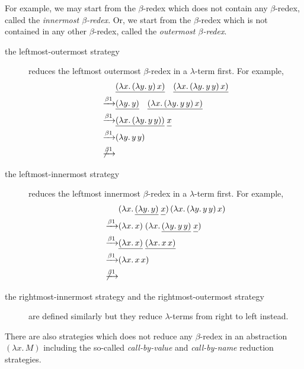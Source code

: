 For example, we may start from the $\beta$-redex which does not contain
any $\beta$-redex, called the \emph{innermost $\beta$-redex}. Or, we start from
the $\beta$-redex which is not contained in any other $\beta$-redex, called the
\emph{outermost $\beta$-redex}. 
\begin{description}
  \item[the leftmost-outermost strategy] reduces the leftmost outermost
    $\beta$-redex in a $\lambda$-term first. For example, 
    \begin{align*}
      & 
      \underline{(\lambda x.\, (\lambda y.\, y)\,x)}\quad
      \underline{(\lambda x.\, (\lambda y.\, y\,y)\,x)}
      \\
      \xrightarrow{\beta1} &
      \underline{(\lambda y.\, y)}\quad
      \underline{(\lambda x.\, (\lambda y.\, y\,y)\, x)} \\
      \xrightarrow{\beta1} &
      \underline{(\lambda x.\, (\lambda y.\, y\,y))}\;
      \underline{\vphantom{(\lambda}x} \\
      \xrightarrow{\beta1} & (\lambda y.\, y\,y) \\
      \not\xrightarrow{\beta1}
    \end{align*}
  \item[the leftmost-innermost strategy] reduces the leftmost innermost
    $\beta$-redex in a $\lambda$-term first. For example, 
    \begin{align*}
      & (\lambda x.\, \underline{(\lambda y.\,
        y)}\;\underline{\vphantom{(\lambda} x})\,
      (\lambda x.\, (\lambda y.\, y\, y)\,x) \\
      \xrightarrow{\beta1} & (\lambda x.\,x)\;
      (\lambda x.\, \underline{(\lambda y.\, y\,
        y)}\;\underline{\vphantom{(\lambda}x}) \\
      \xrightarrow{\beta1} & \underline{(\lambda x.\,x)}\;\underline{(\lambda x.\, x\,x)} \\
      \xrightarrow{\beta1} & (\lambda x.\, x\, x) \\
      \not\xrightarrow{\beta1}
    \end{align*}
  \item[the rightmost-innermost strategy and the rightmost-outermost strategy]
    are defined similarly but they reduce $\lambda$-terms from right to left
    instead.
\end{description}
There are also strategies which does not reduce any $\beta$-redex in an
abstraction~$(\lambda x.\, M)$ including the so-called
\emph{call-by-value} and \emph{call-by-name} reduction strategies.

